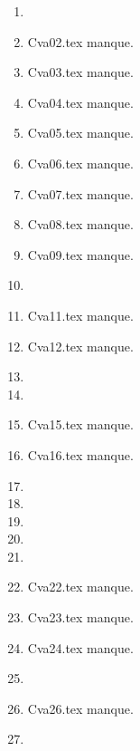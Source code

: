 \begin{enumerate}
  \item  
  \item Cva02.tex manque. 
  \item Cva03.tex manque. 
  \item Cva04.tex manque. 
  \item Cva05.tex manque. 
  \item Cva06.tex manque. 
  \item Cva07.tex manque. 
  \item Cva08.tex manque. 
  \item Cva09.tex manque. 
  \item  
  \item Cva11.tex manque. 
  \item Cva12.tex manque. 
  \item  
  \item  
  \item Cva15.tex manque. 
  \item Cva16.tex manque. 
  \item  
  \item  
  \item  
  \item  
  \item  
  \item Cva22.tex manque. 
  \item Cva23.tex manque. 
  \item Cva24.tex manque. 
  \item  
  \item Cva26.tex manque. 
  \item  
\end{enumerate} 
